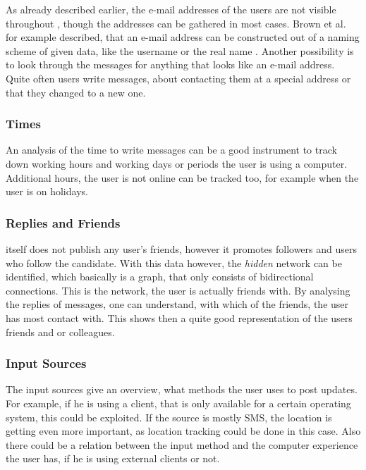As already described earlier, the e-mail addresses of the users are not visible
throughout \Twitter{}, though the addresses can be gathered in most cases.
Brown et al. for example described, that an e-mail address can be constructed out
of a naming scheme of given data, like the username or the real name
\cite{brown2008}. Another possibility is to look through the messages for
anything that looks like an e-mail address. Quite often users write messages,
about contacting them at a special address or that they changed to a new one.

\subsubsection{Times}

An analysis of the time to write messages can be a good instrument to track
down working hours and working days or periods the user is using a computer.
Additional hours, the user is not online can be tracked too, for example
when the user is on holidays.

\subsubsection{Replies and Friends}

\Twitter{} itself does not publish any user's friends, however it promotes
followers and users who follow the candidate. With this data however, the
\textit{hidden} network can be identified, which basically is a graph, that
only consists of bidirectional connections. This is the network, the user is
actually friends with. By analysing the replies of messages, one can
understand, with which of the friends, the user has most contact with. This
shows then a quite good representation of the users friends and or colleagues.

\subsubsection{Input Sources}

The \Twitter{} input sources give an overview, what methods the user uses to
post updates. For example, if he is using a \Twitter{} client, that is only
available for a certain operating system, this could be exploited. If the
source is mostly SMS, the location is getting even more important, as location
tracking could be done in this case. Also there could be a relation between the
input method and the computer experience the user has, if he is using external
clients or not.

